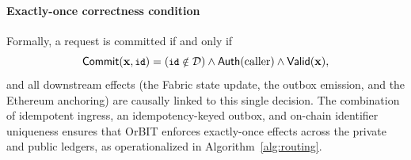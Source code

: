 \documentclass[final,5p,times,twocolumn]{elsarticle}
\begin{document}
\paragraph*{\textbf{Exactly-once correctness condition}}
Formally, a request is committed if and only if
\begin{equation}
\small
  \mathsf{Commit}(\mathbf{x},\texttt{id})
  =
  (\texttt{id}\notin\mathcal{D})
  \land \mathsf{Auth}(\mathrm{caller})
  \land \mathsf{Valid}(\mathbf{x}),
  \label{eq:commit}
\end{equation}
and all downstream effects (the Fabric state update, the outbox emission, and the Ethereum anchoring) are causally linked to this single decision. The combination of idempotent ingress, an idempotency-keyed outbox, and on-chain identifier uniqueness ensures that OrBIT enforces exactly-once effects across the private and public ledgers, as operationalized in Algorithm~\ref{alg:routing}.
\end{document}

